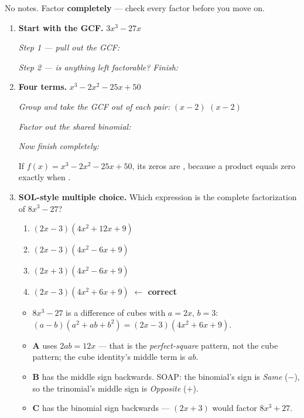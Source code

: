 \documentclass[10pt]{article}
\begin{document}
\namedateperiod

\vspace{0.10in}

No notes. Factor \textbf{completely} --- check every factor before you move on.

\begin{enumerate}[leftmargin=1.8em, itemsep=12pt]
  \item \textbf{Start with the GCF.} $3x^3 - 27x$

    \vspace{3pt}
    \emph{Step 1 --- pull out the GCF:} 

    \vspace{5pt}
    \emph{Step 2 --- is anything left factorable? Finish:} 

  \item \textbf{Four terms.} $x^3 - 2x^2 - 25x + 50$

    \vspace{3pt}
    \emph{Group and take the GCF out of each pair:} \; $(x-2)$ \; $(x-2)$

    \vspace{4pt}
    \emph{Factor out the shared binomial:} 

    \vspace{4pt}
    \emph{Now finish completely:} 

    \vspace{4pt}
    If $f(x) = x^3 - 2x^2 - 25x + 50$, its zeros are , because a product equals zero
    exactly when .

  \item \textbf{SOL-style multiple choice.} Which expression is the complete factorization of
    $8x^3 - 27$?
    \begin{enumerate}[label=\Alph*., leftmargin=1.9em, itemsep=1pt]
      \item $(2x - 3)(4x^2 + 12x + 9)$
      \item $(2x - 3)(4x^2 - 6x + 9)$
      \item $(2x + 3)(4x^2 - 6x + 9)$
      \item $(2x - 3)(4x^2 + 6x + 9)$ \quad \textcolor{keyred}{\textbf{$\leftarrow$ correct}}
    \end{enumerate}
    \begin{itemize}[leftmargin=1.5em, nosep]
      \item $8x^3-27$ is a difference of cubes with $a=2x$, $b=3$: $(a-b)(a^2+ab+b^2) = (2x-3)(4x^2+6x+9)$.
      \item \textbf{A} uses $2ab = 12x$ --- that is the \emph{perfect-square} pattern, not the cube pattern; the cube identity's middle term is $ab$.
      \item \textbf{B} has the middle sign backwards. SOAP: the binomial's sign is \emph{Same} ($-$), so the trinomial's middle sign is \emph{Opposite} ($+$).
      \item \textbf{C} has the binomial sign backwards --- $(2x+3)$ would factor $8x^3 + 27$.
    \end{itemize}
\end{enumerate}
\end{document}
